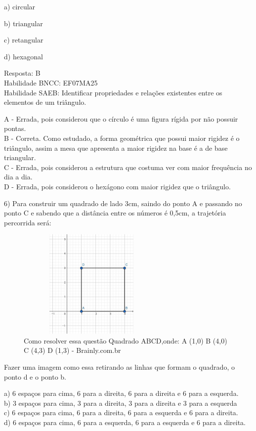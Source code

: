 a) circular

b) triangular

c) retangular

d) hexagonal

Resposta: B\\
Habilidade BNCC: EF07MA25~\\
Habilidade SAEB: Identificar propriedades e relações existentes entre os
elementos de um triângulo.

A - Errada, pois considerou que o círculo é uma figura rígida por não
possuir pontas.\\
B - Correta. Como estudado, a forma geométrica que possui maior rigidez
é o triângulo, assim a mesa que apresenta a maior rigidez na base é a de
base triangular.\\
C - Errada, pois considerou a estrutura que costuma ver com maior
frequência no dia a dia.\\
D - Errada, pois considerou o hexágono com maior rigidez que o
triângulo.

6) Para construir um quadrado de lado 3cm, saindo do ponto A e passando
no ponto C e sabendo que a distância entre os números é 0,5cm, a
trajetória percorrida será:

\begin{figure}
\centering
\includegraphics[width=2.85417in,height=2.09375in]{./imgSAEB_7_MAT/media/image62.jpg}
\caption{Como resolver essa questão Quadrado ABCD,onde: A (1,0) B (4,0)
C (4,3) D (1,3) - Brainly.com.br}
\end{figure}

Fazer uma imagem como essa retirando as linhas que formam o quadrado, o
ponto d e o ponto b.

a) 6 espaços para cima, 6 para a direita, 6 para a direita e 6 para a
esquerda.\\
b) 3 espaços para cima, 3 para a direita, 3 para a direita e 3 para a
esquerda\\
c) 6 espaços para cima, 6 para a direita, 6 para a esquerda e 6 para a
direita.\\
d) 6 espaços para cima, 6 para a esquerda, 6 para a esquerda e 6 para a
direita.

